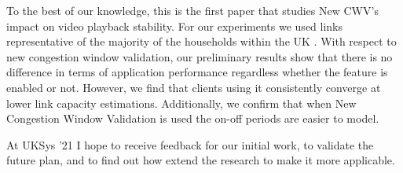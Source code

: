 \documentclass[10pt]{article}
\begin{document}

To the best of our knowledge, this is the first paper that studies New CWV's impact on video playback stability. For our experiments we used links representative of the majority of the households within the UK \cite{online-ofcom-report}. With respect to new congestion window validation, our preliminary results show that there is no difference in terms of application performance regardless whether the feature is enabled or not. However, we find that clients using it consistently converge at lower link capacity estimations. Additionally, we confirm that when New Congestion Window Validation is used the on-off periods are easier to model. 

At UKSys '21 I hope to receive feedback for our initial work, to validate the future plan, and to find out how extend the research to make it more applicable. 



\end{document}
